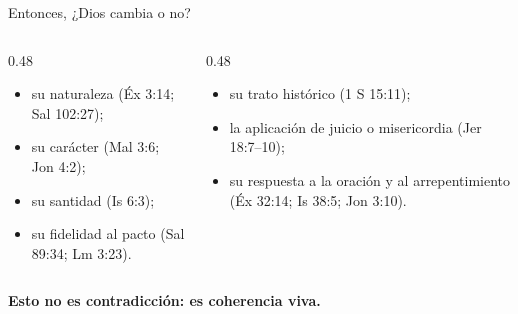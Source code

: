 \documentclass[hyperref={bookmarks=false},aspectratio=169]{beamer}
\newcommand{\destacar}[1]{\textbf{\textcolor{azul}{#1}}}
\begin{document}
\begin{frame}{Entonces, ¿Dios cambia o no?}
\begin{columns}[t,onlytextwidth]
\begin{column}{0.48\textwidth}
\begin{tcolorbox}[colback=papiro,colframe=azul,boxrule=1pt,arc=3pt,title={\small Dios NO cambia en},colbacktitle=azul,coltitle=papiro]
\small
\begin{itemize}
\item su naturaleza (Éx 3:14; Sal 102:27);
\item su carácter (Mal 3:6; Jon 4:2);
\item su santidad (Is 6:3);
\item su fidelidad al pacto (Sal 89:34; Lm 3:23).
\end{itemize}
\end{tcolorbox}
\end{column}
\begin{column}{0.48\textwidth}
\begin{tcolorbox}[colback=papiro,colframe=dorado,boxrule=1pt,arc=3pt,title={\small Dios SÍ cambia en},colbacktitle=dorado,coltitle=azuloscuro]
\small
\begin{itemize}
\item su trato histórico (1 S 15:11);
\item la aplicación de juicio o misericordia (Jer 18:7--10);
\item su respuesta a la oración y al arrepentimiento (Éx 32:14; Is 38:5; Jon 3:10).
\end{itemize}
\end{tcolorbox}
\end{column}
\end{columns}\par\medskip
\centering\destacar{Esto no es contradicción: es coherencia viva.}
\end{frame}
\end{document}
